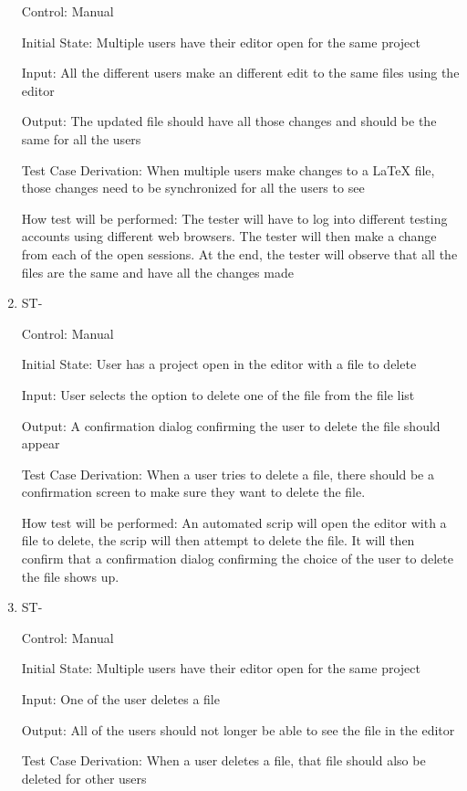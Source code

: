 \documentclass[12pt, titlepage]{article}
\newcounter{TESTID}
\newcommand\TESTNUM{\stepcounter{TESTID}\theTESTID}
\begin{document}
\begin{enumerate}
		Control: Manual
		
		Initial State: Multiple users have their editor open for the same project
		
		Input: All the different users make an different edit to the same files using the editor
		
		Output: The updated file should have all those changes and should be the same for all the users
		
		Test Case Derivation: When multiple users make changes to a LaTeX file, those changes need to be synchronized for all the users to see
		
		How test will be performed: The tester will have to log into different testing accounts using different web browsers. The tester will then make a change from each of the open sessions. At the end, the tester will observe that all the files are the same and have all the changes made
		
		\item{ST-\TESTNUM\\}
		
		Control: Manual
		
		Initial State: User has a project open in the editor with a file to delete
		
		Input: User selects the option to delete one of the file from the file list
		
		Output: A confirmation dialog confirming the user to delete the file should appear
		
		Test Case Derivation: When a user tries to delete a file, there should be a confirmation screen to make sure they want to delete the file.
		
		How test will be performed: An automated scrip will open the editor with a file to delete, the scrip will then attempt to delete the file. It will then confirm that a confirmation dialog confirming the choice of the user to delete the file shows up.
		
		\item{ST-\TESTNUM\\}
		
		Control: Manual
		
		Initial State: Multiple users have their editor open for the same project
		
		Input: One of the user deletes a file
		
		Output: All of the users should not longer be able to see the file in the editor
		
		Test Case Derivation: When a user deletes a file, that file should also be deleted for other users
		

\end{enumerate}
\end{document}
